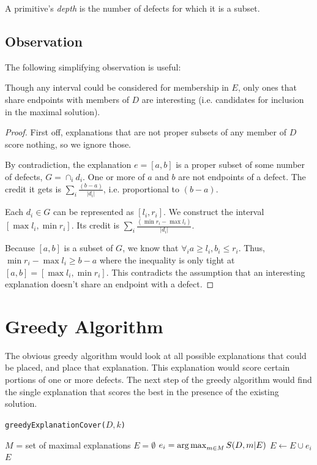 A primitive's {\it depth} is the number of defects for which it is a subset.  

\subsection{Observation}

The following simplifying observation is useful:

\begin{lem} \label{lemma:Maximal}
Though any interval could be considered for membership in $E$, only ones that share endpoints with members of $D$ are interesting (i.e. candidates for inclusion in the maximal solution).  
\end{lem}

\begin{proof}
First off, explanations that are not proper subsets of any member of $D$ score nothing, so we ignore those.

By contradiction, the explanation $e = [a,b]$ is a proper subset of some number of defects, $G = \cap_i d_i$.  One or more of $a$ and $b$ are not endpoints of a defect.  The credit it gets is $\sum_i \frac{ (b-a) }{|d_i|} $, i.e. proportional to $(b-a)$.

Each $d_i \in G$ can be represented as $[l_i,r_i]$.  We construct the interval $[\max{l_i}, \min{r_i}]$.  Its credit is $\sum_i \frac{ (\min{r_i} - \max{l_i} ) }{|d_i|} $.  

Because $[a,b]$ is a subset of $G$, we know that $\forall_i a \geq l_i, b_i \leq r_i$.  Thus, $\min{r_i} - \max{l_i} \geq b-a$ where the inequality is only tight at $[a,b] = [\max{l_i}, \min{r_i}]$.  This contradicts the assumption that an interesting explanation doesn't share an endpoint with a defect.
\end{proof}

\section{Greedy Algorithm} \label{sec:greedy}

The obvious greedy algorithm would look at all possible explanations that could be placed, and place that explanation. This explanation would score certain portions of one or more defects.  The next step of the greedy algorithm would find the single explanation that scores the best in the presence of the existing solution.  

\begin{algorithm}
  \caption{ \texttt{greedyExplanationCover($D,k$)} }
  \label{alg:greedy}
  \begin{algorithmic}
    \State $M$ = set of maximal explanations
    \State $E = \emptyset$
    \State $e_i = \operatorname*{arg\,max}_{m\in M} S(D,m|E)$
    \State $E \leftarrow E \cup e_i$
    \EndWhile
    \State \Return $E$
  \end{algorithmic}
\end{algorithm}

